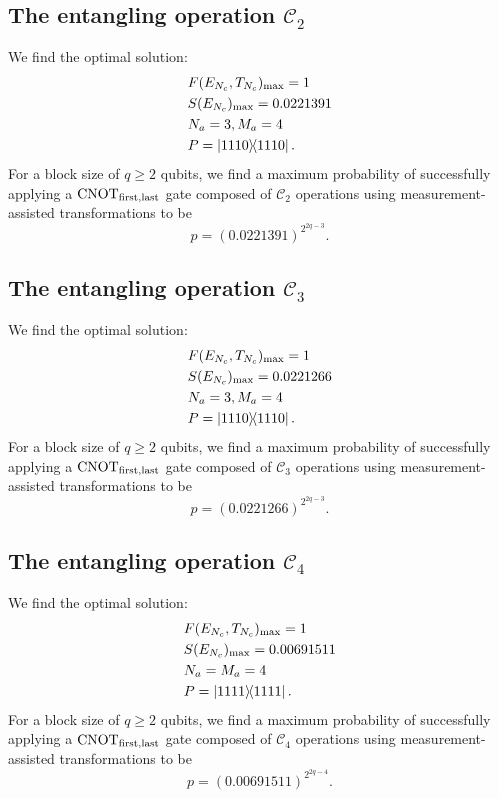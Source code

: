 \documentclass[aps,pra,twocolumn,superscriptaddress,floatfix,10pt]{revtex4}
\begin{document}
\subsection{The entangling operation $\mathcal{C}_2$}
We find the optimal solution:
\begin{eqnarray}
& F(E_{N_c},T_{N_c})_{\rm max} = 1 \nonumber \\
& S(E_{N_c})_{\rm max} = 0.0221391 \\
&N_a = 3,M_a=4 \nonumber \\
&P = \outerproduct{1110}{1110} \nonumber	.
\end{eqnarray}
For a block size of $q \ge 2$ qubits, we find a maximum probability of successfully applying a $\mbox{CNOT}_{\rm first,last}$ gate composed of $\mathcal{C}_2$ operations  using measurement-assisted transformations to be
\begin{equation}
\label{2C2T Result}
p = (0.0221391)^{2^{2q-3}}.
\end{equation}
\subsection{The entangling operation $\mathcal{C}_3$}
We find the optimal solution:
\begin{eqnarray}
& F(E_{N_c},T_{N_c})_{\rm max} = 1 \nonumber \\
& S(E_{N_c})_{\rm max} = 0.0221266 \\
& N_a = 3,M_a=4 \nonumber \\
& P = \outerproduct{1110}{1110} .\nonumber	
\end{eqnarray}
For a block size of $q \ge 2 $ qubits, we find a maximum probability of successfully applying a $\mbox{CNOT}_{\rm first,last}$ gate composed of $\mathcal{C}_3$ operations  using measurement-assisted transformations to be
\begin{equation}
\label{1C4T Result}
p = (0.0221266)^{2^{2q-3}}.
\end{equation}
\subsection{The entangling operation $\mathcal{C}_4$}
We find the optimal solution:
 \begin{eqnarray}
 & F(E_{N_c},T_{N_c})_{\rm max} = 1 \nonumber\\
 & S(E_{N_c})_{\rm max} = 0.00691511 \\
 & N_a = M_a=4 \nonumber\\
 & P = \outerproduct{1111}{1111}. \nonumber	
 \end{eqnarray}
For a block size of $q \ge 2$ qubits, we find a maximum probability of successfully applying a $\mbox{CNOT}_{\rm first,last}$ gate composed of $\mathcal{C}_4$ operations  using measurement-assisted transformations to be
 \begin{equation}
 \label{2C4T Result}
 p = (0.00691511)^{2^{2q-4}}.
 \end{equation}
\end{document}
